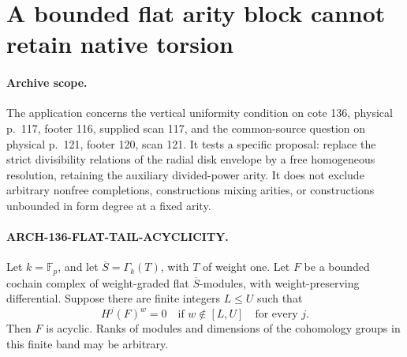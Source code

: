 \section{A bounded flat arity block cannot retain native torsion}
\label{sec:136-flat-arity-tail}

\paragraph{Archive scope.}
The application concerns the vertical uniformity condition on cote 136,
physical p.~117, footer 116, supplied scan 117, and the common-source
question on physical p.~121, footer 120, scan 121. It tests a specific
proposal: replace the strict divisibility relations of the radial disk
envelope by a free homogeneous resolution, retaining the auxiliary
divided-power arity. It does not exclude arbitrary nonfree completions,
constructions mixing arities, or constructions unbounded in form degree
at a fixed arity.

\paragraph{ARCH-136-FLAT-TAIL-ACYCLICITY.}
Let \(k=\mathbb F_p\), and let
\(\overline S=\Gamma_k(T)\), with \(T\) of weight one.
Let \(F\) be a bounded cochain complex of weight-graded flat
\(\overline S\)-modules, with weight-preserving differential.
Suppose there are finite integers \(L\leq U\) such that
\[
                 H^j(F)^w=0\quad\text{if }w\notin[L,U]
                       \quad\text{for every }j.
                                                        \tag{136.FT1}
\]
Then \(F\) is acyclic. Ranks of modules and dimensions of the
cohomology groups in this finite band may be arbitrary.

